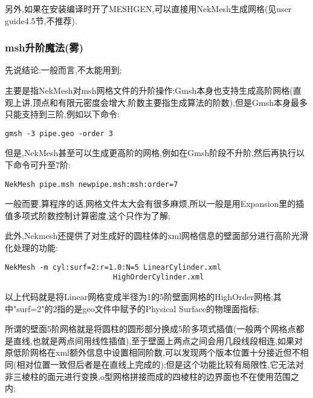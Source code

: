 另外,如果在安装编译时开了MESHGEN,可以直接用NekMesh生成网格(见user guide4.5节,不推荐).

\subsubsection{msh升阶魔法(雾)}
先说结论:一般而言,不太能用到;\par
主要是指NekMesh对msh网格文件的升阶操作;Gmsh本身也支持生成高阶网格(直观上讲,顶点和有限元密度会增大,阶数主要指生成算法的阶数),但是Gmsh本身最多只能支持到三阶,例如以下命令:\par
\begin{lstlisting}[frame=single]
	gmsh -3 pipe.geo -order 3
\end{lstlisting}
\par
但是,NekMesh甚至可以生成更高阶的网格,例如在Gmsh阶段不升阶,然后再执行以下命令可升至7阶:\par
\begin{lstlisting}[frame=single]
	NekMesh pipe.msh newpipe.msh:msh:order=7
\end{lstlisting}
\par

一般而要,算程序的话,网格文件太大会有很多麻烦,所以一般是用Expansion里的插值多项式阶数控制计算密度,这个只作为了解;

此外,Nekmesh还提供了对生成好的圆柱体的xml网格信息的壁面部分进行高阶光滑化处理的功能:
\begin{lstlisting}[frame=single]
NekMesh -m cyl:surf=2:r=1.0:N=5 LinearCylinder.xml 
				         HighOrderCylinder.xml
\end{lstlisting}
\par
以上代码就是将Linear网格变成半径为1的5阶壁面网格的HighOrder网格;其中"surf=2"的2指的是geo文件中赋予的Physical Surface的物理面指标;\par
所谓的壁面5阶网格就是将圆柱的圆形部分换成5阶多项式插值(一般两个网格点都是直线,也就是两点间用线性插值),至于壁面上两点之间会用几段线段相连,如果对原低阶网格在xml额外信息中设置相同阶数,可以发现两个版本位置十分接近但不相同(相对位置一致但后者是在直线上完成的);但是这个功能比较有局限性,它无法对非三棱柱的面元进行变换,o型网格拼接而成的四棱柱的边界面也不在使用范围之内;

